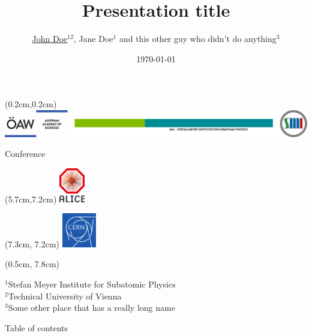 \documentclass[9pt, aspectratio=169]{beamer}
\author{\underline{John Doe$^{12}$}, Jane Doe$^1$ and this other guy who didn't do anything$^3$}
\title{Presentation title}
\date{\scriptsize \today}
\newcommand{\conference}{\scriptsize Conference}
\begin{document}
\begin{frame}[plain]
    \begin{textblock*}{\textwidth}(0.2cm,0.2cm)
        \includegraphics[width=1.02\textwidth]{smi-template/oeaw-smi-logos.pdf}
    \end{textblock*}
    \vspace{0.8cm}
    \begin{center}
        {\large \bfseries \color{OEAWblue} \inserttitle\par}
        \vspace{1cm}
        
        {\insertauthor\par}
        \vspace{1cm}
        
        {\insertdate\par}
        \conference
        \begin{textblock*}{\textwidth}(5.7cm,7.2cm)
            \includegraphics[height=1.5cm]{smi-template/more-logos/alice-logo.png}
        \end{textblock*}
        \begin{textblock*}{\textwidth}(7.3cm, 7.2cm)
            \includegraphics[height=1.5cm]{smi-template/more-logos/cern-logo.png}
        \end{textblock*}

    \begin{textblock*}{\textwidth}(0.5cm, 7.8cm)
        \raggedright
        $^1$Stefan Meyer Institute for Subatomic Physics\\
        $^2$Technical University of Vienna\\
        $^3$Some other place that has a really long name
    \end{textblock*}
    \end{center}
\end{frame}
\begin{frame}{Table of contents}
\tableofcontents[sectionstyle=show,
subsectionstyle=show/shaded/hide,
subsubsectionstyle=show/shaded/hide]
\end{frame}
\end{document}
